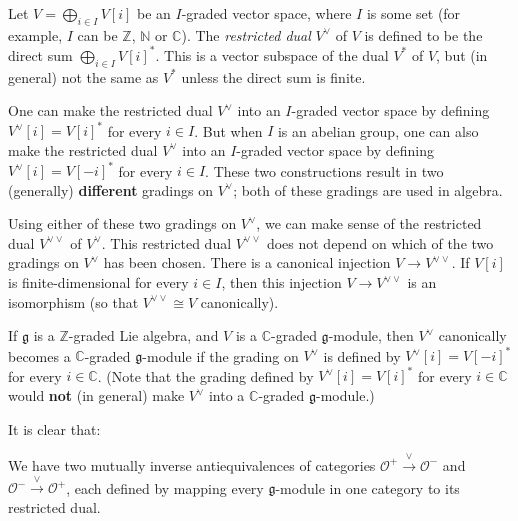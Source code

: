 \documentclass[etingof-lie.tex]{subfiles}
\begin{document}
\begin{definition}
Let $V=\bigoplus\limits_{i\in I}V\left[  i\right]  $ be an $I$-graded vector
space, where $I$ is some set (for example, $I$ can be $\mathbb{Z}$,
$\mathbb{N}$ or $\mathbb{C}$). The \textit{restricted dual} $V^{\vee}$ of $V$
is defined to be the direct sum $\bigoplus\limits_{i\in I}V\left[  i\right]
^{\ast}$. This is a vector subspace of the dual $V^{\ast}$ of $V$, but (in
general) not the same as $V^{\ast}$ unless the direct sum is finite.

One can make the restricted dual $V^{\vee}$ into an $I$-graded vector space by
defining $V^{\vee}\left[  i\right]  =V\left[  i\right]  ^{\ast}$ for every
$i\in I$. But when $I$ is an abelian group, one can also make the restricted
dual $V^{\vee}$ into an $I$-graded vector space by defining $V^{\vee}\left[
i\right]  =V\left[  -i\right]  ^{\ast}$ for every $i\in I$. These two
constructions result in two (generally) \textbf{different} gradings on
$V^{\vee}$; both of these gradings are used in algebra.

Using either of these two gradings on $V^{\vee}$, we can make sense of the
restricted dual $V^{\vee\vee}$ of $V^{\vee}$. This restricted dual
$V^{\vee\vee}$ does not depend on which of the two gradings on $V^{\vee}$ has
been chosen. There is a canonical injection $V\rightarrow V^{\vee\vee}$. If
$V\left[  i\right]  $ is finite-dimensional for every $i\in I$, then this
injection $V\rightarrow V^{\vee\vee}$ is an isomorphism (so that $V^{\vee\vee
}\cong V$ canonically).

If $\mathfrak{g}$ is a $\mathbb{Z}$-graded Lie algebra, and $V$ is a
$\mathbb{C}$-graded $\mathfrak{g}$-module, then $V^{\vee}$ canonically becomes
a $\mathbb{C}$-graded $\mathfrak{g}$-module if the grading on $V^{\vee}$ is
defined by $V^{\vee}\left[  i\right]  =V\left[  -i\right]  ^{\ast}$ for every
$i\in\mathbb{C}$. (Note that the grading defined by $V^{\vee}\left[  i\right]
=V\left[  i\right]  ^{\ast}$ for every $i\in\mathbb{C}$ would \textbf{not} (in
general) make $V^{\vee}$ into a $\mathbb{C}$-graded $\mathfrak{g}$-module.)
\end{definition}

It is clear that:

\begin{proposition}
We have two mutually inverse antiequivalences of categories $\mathcal{O}%
^{+}\overset{\vee}{\rightarrow}\mathcal{O}^{-}$ and $\mathcal{O}%
^{-}\overset{\vee}{\rightarrow}\mathcal{O}^{+}$, each defined by mapping every
$\mathfrak{g}$-module in one category to its restricted dual.
\end{proposition}
\end{document}
